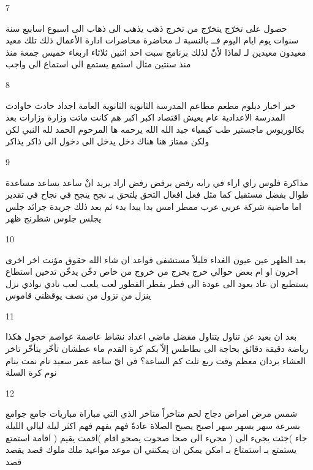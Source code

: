 \documentclass[twocolumn,a4paper]{article}
\newcommand{\prth}[1]{\textenglish{)}#1\textenglish{(}}
\begin{document}
7

\textarabic{ حصول على  
 تخرّج  يتخرّج من  
 تخرج  
 ذهب  يذهب الى  
 ذهاب الى  
 اسبوع  اسابيع  
 سنة  سنوات  
 يوم  ايام  
 اليوم  
 فــ  
 بالنسبة لـ  
 محاضرة  محاضرات
 ادارة اﻷعمال  
 ذلك  تلك  
 معيد  معيدون
  معيدين
  لـ  
 لماذا  
 ﻷنّ  
 لذلك  
 برنامج  
 سبت  
 احد  
 اثنين  
 ثلاثاء  
 اربعاء  
 خميس  
 جمعة  
 منذ  
 منذ سنتين  
 مثال  
 استمع  يستمع الى  
 استماع الى   
 واجب  
}

8

\textarabic{ خبر  اخبار  
 دبلوم  
 مطعم  مطاعم  
 المدرسة الثانوية  
 الثانوية العامة  
 اجداد  
 حادث  حاوادث  
 المدرسة الاعدادية  
 عام  
 يعيش  
 اقتصاد  
 اكبر  
 اكبر هم  
 كانت  
 ماتت  
 وزارة  وزارات
 بعد  
 بكالوريوس  
 ماجستير  
 طب  
 كيمياء  
 جيد  
 الله  
 الله يرحمه  ها  
 المرحوم  
 الحمد لله  
 النبي  
 لكن  ولكن  
 ممتاز  
 هنا  
 هناك  
 دخل  يدخل الى  
 دخول الى  
 ذاكر  يذاكر  
}

9

\textarabic{ مذاكرة  
 فلوس  
 راي  اراء  
 في رايه  
 رفض  يرفض  
 رفض  
 اراد  يريد انْ  
 ساعد  يساعد  
 مساعدة  
 طوال  
 بفضل  
 مستقبل  
 كما  
 مثل  
 فعل  افعال  
 التحق  يلتحق بـ  
 نجح  ينجح في  
 نجاح في  
 تقدير  
 اما  
 ماضية  
 شركة  
 عربي  عرب  
 ممطر  
 امس  
 بدا  يبدا  
 بدء  
 ثم  
 بعد ذلك  
 جريدة  جرائد  
 جلس  يجلس  
 جلوس  
 شطرنج  
 ظهر  
}

10

\textarabic{ بعد الظهر  
 عين  عيون  
 الغداء  
 قليلاً  
 مستشفى  
 قواعد  
 ان شاء الله  
 حقوق  
 مؤنث  
 اخر  اخرى   
 اخرون  
 او  
 ام  
 بعض  
 حوالي  
 خرج  يخرج من  
 خروج من  
 خاص  
 دخّن  يدخّن  
 تدخين  
 استطاع  يستطيع ان  
 عاد  يعود الى  
 عودة الى  
 فطر  يفطر  
 الفطور  
 لعب  يلعب  
 لعب  
 نادي  نوادي  
 نزل  ينزل من  
 نزول من  
 نصف  
 يوقظني  
 قاموس  
}

11

\textarabic{ بعد ان  
 بعيد عن  
 تناول  يتناول  
 مفضل  
 ماضي  
 اعداد  
 نشاط   
 عاصمة  عواصم  
 خجول  
 هكذا  
 رياضة  
 دقيقة  دقائق  
 بحاجة الى  
 بطاطس  
 إلاّ  
 بكم  
 كرة القدم  
 ماء  
 عطشان  
 تأخّر  يتأخّر  
 تاخر  
 العشاء  
 بردان  
 معظم  
 وقت  
 ربع  
 ثلث  
 كم الساعة؟  
 في ايّ ساعة  
 عمر  
 سعيد  
 نام  نمت  ينام  
 نوم  
 كرة السلة  
}

12

\textarabic{ شمس  
 مرض  امراض  
 دجاج  
 لحم  
 متاخراً  
 متاخر  
 الذي  التي  
 مباراة  مباريات  
 جامع  جوامع  
 بسرعة  
 سهر  يسهر  
 سهر  
 اصبح  يصبح  
 الصلاة  
 عادةً  
 فهم  يفهم  
 فهم  
 اكثر  
 ليلة  ليالي  
 الليلة  
 جاء \prth{جئت يجيء الى } 
 مجيء الى  
 صحا  صحوت  يصحو  
 اقام \prth{اقمت يقيم } 
 اقامة  
 استمتع  يستمتع بـ  
 استمتاع بـ  
 امكن  يمكن ان  
 يمكنني ان  
 موعد  مواعيد  
 ملك  ملوك  
 قصد  يقصد  
 قصد  
}
\end{document}
